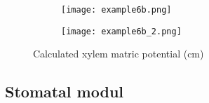 \begin{figure}
\begin{subfigure}[c]{0.5\textwidth}
\texttt{[image: example6b.png]}
 \label{fig:xylemfluxa}
\end{subfigure}
\begin{subfigure}[c]{0.5\textwidth}
\texttt{[image: example6b\_2.png]}
 \label{fig:xylemfluxb}
\end{subfigure}
\caption{Calculated xylem matric potential (cm)} 
\end{figure}

\subsection{Stomatal modul} \label{ssec:stomatal}

